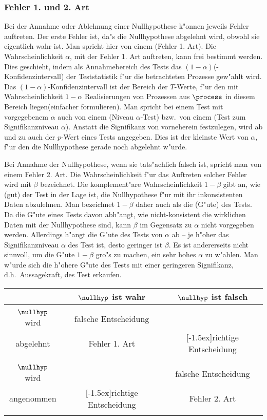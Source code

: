 \subsubsection{Fehler 1. und 2. Art}
Bei der Annahme oder Ablehnung einer Nullhypothese k"onnen jeweils Fehler auftreten. Der
erste Fehler ist, da"s die Nullhypothese abgelehnt wird, obwohl sie eigentlich wahr ist.
Man spricht hier von einem \begriff(Fehler 1. Art). Die Wahrscheinlichkeit $\alpha$, mit
der Fehler 1. Art auftreten, kann frei bestimmt werden. Dies geschieht, indem als
Annahmebereich des Tests das $(1-\alpha)$\begriff(-Konfidenzintervall) der Teststatistik
f"ur die betrachteten Prozesse gew"ahlt wird. Das $(1-\alpha)$-Konfidenzintervall ist der
Bereich der $T$-Werte, f"ur den mit Wahrscheinlichkeit $1-\alpha$ Realisierungen von
Prozessen aus $\process$ in diesem Bereich liegen\korrektur(einfacher formulieren).  Man
spricht bei einem Test mit vorgegebenem $\alpha$ auch von einem \begriff(Niveau
$\alpha$-Test) bzw.\ von einem \begriff(Test zum Signifikanzniveau $\alpha$). Anstatt die
Signifikanz von vorneherein festzulegen, wird ab und zu auch der $p$-Wert eines Tests
angegeben. Dies ist der kleinste Wert von $\alpha$, f"ur den die Nullhypothese gerade noch
abgelehnt w"urde.

Bei Annahme der Nullhypothese, wenn sie tats"achlich falsch ist, spricht man von einem
Fehler 2. Art.  Die Wahrscheinlichkeit f"ur das Auftreten solcher Fehler wird mit $\beta$
bezeichnet. Die komplement"are Wahrscheinlichkeit $1-\beta$ gibt an, wie \naja(gut) der
Test in der Lage ist, die Nullhypothese f"ur mit ihr inkonsistenten Daten abzulehnen. Man
bezeichnet $1-\beta$ daher auch als die \begriff(G"ute) des Tests.  Da die G"ute eines
Tests davon abh"angt, wie nicht-konsistent die wirklichen Daten mit der Nullhypothese
sind, kann $\beta$ im Gegensatz zu $\alpha$ nicht vorgegeben werden.  Allerdings h"angt
die G"ute des Tests von $\alpha$ ab -- je h"oher das Signifikanzniveau $\alpha$ des Test ist,
desto geringer ist $\beta$. Es ist andererseits nicht sinnvoll, um die G"ute $1-\beta$
gro"s zu machen, ein sehr hohes $\alpha$ zu w"ahlen. Man w"urde sich die h"ohere G"ute des Tests
mit einer geringeren Signifikanz, d.h.\ Aussagekraft, des Test erkaufen.

\begin{center}
\newcommand{\rb}[1]{\raisebox{1.5ex}[-1.5ex]{#1}}
\begin{tabular}{c|c|c}
 & $\nullhyp$ ist wahr & $\nullhyp$ ist falsch \\ \hline
& & \\
$\nullhyp$ wird & falsche Entscheidung &    \\
abgelehnt & Fehler 1. Art & \rb{richtige Entscheidung} \\ 
& & \\ 
\hline
 & & \\
$\nullhyp$ wird &   & falsche Entscheidung  \\
angenommen &  \rb{richtige Entscheidung} & Fehler 2. Art \\
& & \\
\end{tabular}
\end{center}


